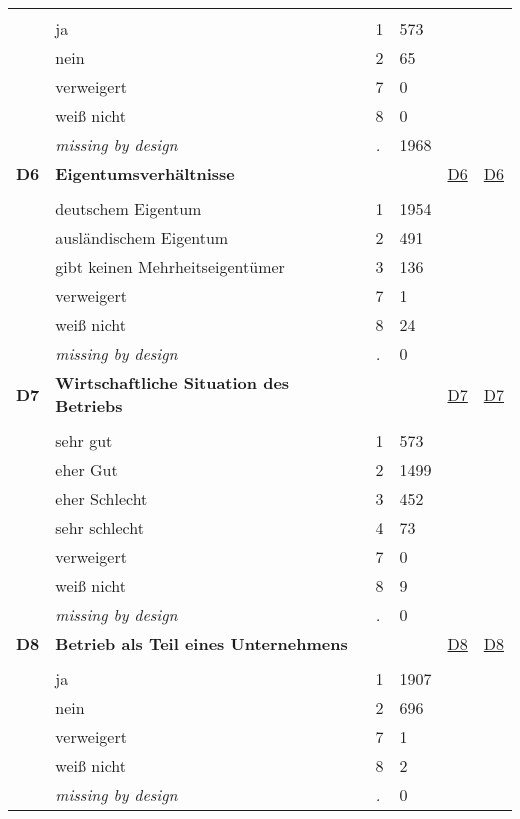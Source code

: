 \begin{longtable}{| L{2.45cm} | L{6cm} | C{1.5cm} | R{1cm} | C{2.25cm} | C{2.25cm} |}
   &  &  &  &  &  \\ 
   & ja & 1 & 573 &  &  \\ 
   & nein & 2 & 65 &  &  \\ 
   & verweigert & 7 & 0 &  &  \\ 
   & weiß nicht & 8 & 0 &  &  \\ 
   & \textit{missing by design} & \textit{.} & 1968 &  &  \\ 
   \midrule
\textbf{D6}\label{var:D6} & \textbf{Eigentumsverhältnisse} &  &  & \hyperref[D6]{D6} & \hyperref[var:suf:D6]{D6} \\ 
   &  &  &  &  &  \\ 
   & deutschem Eigentum & 1 & 1954 &  &  \\ 
   & ausländischem Eigentum & 2 & 491 &  &  \\ 
   & gibt keinen Mehrheitseigentümer & 3 & 136 &  &  \\ 
   & verweigert & 7 & 1 &  &  \\ 
   & weiß nicht & 8 & 24 &  &  \\ 
   & \textit{missing by design} & \textit{.} & 0 &  &  \\ 
   \midrule
\textbf{D7}\label{var:D7} & \textbf{Wirtschaftliche Situation des Betriebs} &  &  & \hyperref[D7]{D7} & \hyperref[var:suf:D7]{D7} \\ 
   &  &  &  &  &  \\ 
   & sehr gut & 1 & 573 &  &  \\ 
   & eher Gut & 2 & 1499 &  &  \\ 
   & eher Schlecht & 3 & 452 &  &  \\ 
   & sehr schlecht & 4 & 73 &  &  \\ 
   & verweigert & 7 & 0 &  &  \\ 
   & weiß nicht & 8 & 9 &  &  \\ 
   & \textit{missing by design} & \textit{.} & 0 &  &  \\ 
   \midrule
\textbf{D8}\label{var:D8} & \textbf{Betrieb als Teil eines Unternehmens} &  &  & \hyperref[D8]{D8} & \hyperref[var:suf:D8]{D8} \\ 
   &  &  &  &  &  \\ 
   & ja & 1 & 1907 &  &  \\ 
   & nein & 2 & 696 &  &  \\ 
   & verweigert & 7 & 1 &  &  \\ 
   & weiß nicht & 8 & 2 &  &  \\ 
   & \textit{missing by design} & \textit{.} & 0 &  &  \\ 

\end{longtable}
